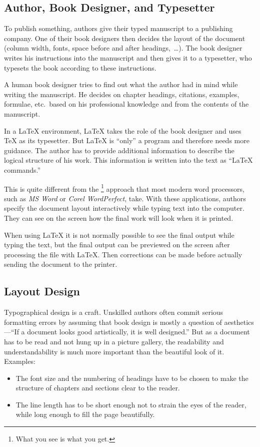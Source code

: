 \subsection{Author, Book Designer, and Typesetter}

To publish something, authors give their typed manuscript to a
publishing company. One of their book designers then
decides the layout of the document (column width, fonts, space before
and after headings,~\ldots). The book designer writes his instructions
into the manuscript and then gives it to a typesetter, who typesets the
book according to these instructions.

A human book designer tries to find out what the author had in mind
while writing the manuscript. He decides on chapter headings,
citations, examples, formulae, etc.\ based on his professional
knowledge and from the contents of the manuscript.

In a \LaTeX{} environment, \LaTeX{} takes the role of the book
designer and uses \TeX{} as its typesetter. But \LaTeX{} is ``only'' a
program and therefore needs more guidance. The author has to provide
additional information to describe the logical structure of his
work. This information is written into the text as ``\LaTeX{}
commands.''

This is quite different from the \footnote{What you see is
  what you get.} approach that most modern word processors, such as
\emph{MS Word} or \emph{Corel WordPerfect}, take. With these
applications, authors specify the document layout interactively while
typing text into the computer. They can see on the
screen how the final work will look when it is printed.

When using \LaTeX{} it is not normally possible to see the final output
while typing the text, but the final output can be previewed on the
screen after processing the file with \LaTeX. Then corrections can be
made before actually sending the document to the printer.

\subsection{Layout Design}

Typographical design is a craft. Unskilled authors often commit
serious formatting errors by assuming that book design is mostly a
question of aesthetics---``If a document looks good artistically,
it is well designed.'' But as a document has to be read and not hung
up in a picture gallery, the readability and understandability is 
much more important than the beautiful look of it.
Examples: 
\begin{itemize}
\item The font size and the numbering of headings have to be chosen to make
  the structure of chapters and sections clear to the reader.
\item The line length has to be short enough not to strain
  the eyes of the reader, while long enough to fill the page
  beautifully.
\end{itemize}


